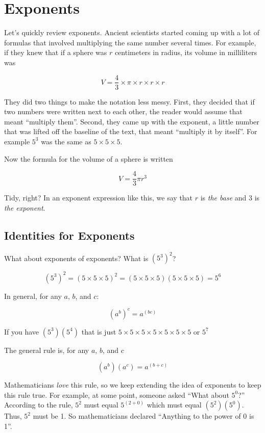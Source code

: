 \chapter{Exponents}

Let's quickly review exponents. Ancient scientists started coming up
with a lot of formulas that involved multiplying the same number
several times.  For example, if they knew that if a sphere was $r$
centimeters in radius, its volume in milliliters was

$$V = \frac{4}{3} \times \pi \times r \times r \times r$$

They did two things to make the notation less messy.  First, they
decided that if two numbers were written next to each other, the
reader would assume that meant ``multiply them''.  Second, they came
up with the exponent, a little number that was lifted off the
baseline of the text, that meant ``multiply it by itself''.  For
example $5^3$ was the same as $5 \times 5 \times 5$.

Now the formula for the volume of a sphere is written

$$V = \frac{4}{3} \pi r^3$$

Tidy, right? In an exponent expression like this, we say that $r$ is
\textit{the base} and $3$ is \textit{the exponent}.

\section{Identities for Exponents}

What about exponents of exponents?  What is $\left(5^3\right)^2$?

$$\left(5^3\right)^2 = (5 \times 5 \times 5)^2 = (5 \times 5 \times 5)(5 \times 5 \times 5) = 5^6$$

In general, for any $a$, $b$, and $c$:

$$\left(a^b\right)^c = a^{(bc)}$$

If you have $\left( 5^3 \right) \left(5^4 \right)$ that is just $5 \times 5 \times 5 \times 5 \times 5 \times 5 \times 5$ or $5^7$

The general rule is, for any $a$, $b$, and $c$

$$\left(a^b\right)\left(a^c\right) = a^{(b + c)}$$

Mathematicians \textit{love} this rule, so we keep extending the idea
of exponents to keep this rule true. For example, at some point,
someone asked ``What about $5^0$?'' According to the rule, $5^{2}$
must equal $5^{(2 + 0)}$ which must equal
$\left(5^2\right)\left(5^0\right)$.  Thus, $5^2$ must be 1. So
mathematicians declared ``Anything to the power of 0 is 1''.

